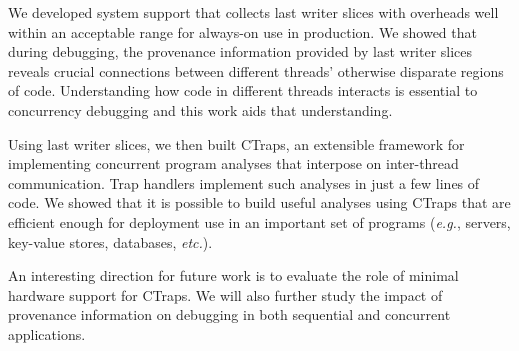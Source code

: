 \documentclass[preprint,9pt]{sigplanconf}
\newcommand{\ctraps}{CTraps\xspace}
\begin{document}
We developed system support that collects last writer slices with overheads
well within an acceptable range for always-on use in production.  We showed
that during debugging, the provenance information provided by last writer
slices reveals crucial connections between different threads' otherwise
disparate regions of code.  Understanding how code in different threads
interacts is essential to concurrency debugging and this work aids that
understanding.

Using last writer slices, we then built \ctraps, an extensible framework for
implementing concurrent program analyses that interpose on inter-thread
communication.  Trap handlers implement such analyses in just a few lines of
code.  We showed that it is possible to build useful analyses using \ctraps
that are efficient enough for deployment use in an important set of programs
({\em e.g.}, servers, key-value stores, databases, {\em etc.}).  

An interesting direction for future work is to evaluate the role of minimal
hardware support for \ctraps.  We will also further study the impact of
provenance information on debugging in both sequential and concurrent
applications. 




{}

\end{document}
